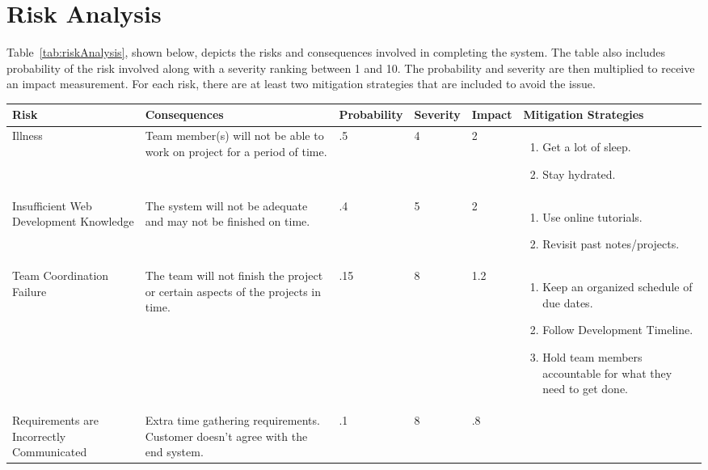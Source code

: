 \chapter{Risk Analysis}

Table~\ref{tab:riskAnalysis}, shown below, depicts the risks and consequences involved in completing the system. The table also includes probability of the risk involved along with a severity ranking between 1 and 10. The probability and severity are then multiplied to receive an impact measurement. For each risk, there are at least two mitigation strategies that are included to avoid the issue. 

\begin{table}
\centering
\begin{tabular}{|p{7em}|p{7em}|p{5em}|p{4em}|p{4em}|p{11em}|}
\hline
\textbf{Risk} & \textbf{Consequences} & \textbf{Probability} & \textbf{Severity} & \textbf{Impact} & \textbf{Mitigation Strategies} \\
\hline
Illness & Team member(s) will not be able to work on project for a period of time. & .5 & 4 & 2 & \begin{enumerate}
	\item Get a lot of sleep.
	\item Stay hydrated.
\end{enumerate} \\
\hline
Insufficient Web Development Knowledge & The system will not be adequate and may not be finished on time. & .4 & 5 & 2 & 
\begin{enumerate}
	\item Use online tutorials.
	\item Revisit past notes/projects.
\end{enumerate} \\
\hline
Team Coordination Failure & The team will not finish the project or certain aspects of the projects in time. & .15 & 8 & 1.2 & 
\begin{enumerate}
	\item Keep an organized schedule of due dates.
	\item Follow Development Timeline.
	\item Hold team members accountable for what they need to get done.
\end{enumerate} \\
\hline
Requirements are Incorrectly Communicated & Extra time gathering requirements. Customer doesn't agree with the end system. & .1 & 8 & .8 & 
 \begin{enumerate}

\end{enumerate}
\end{tabular}
\end{table}
